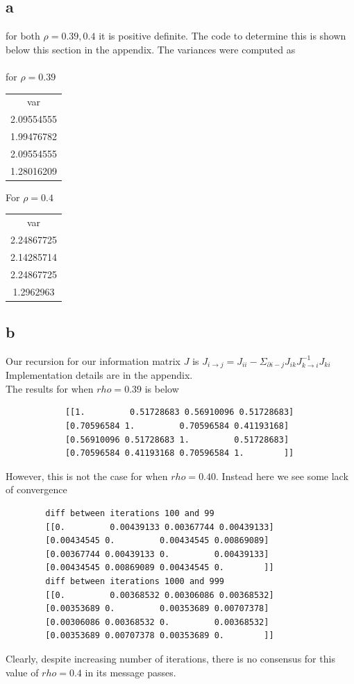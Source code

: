 \documentclass[12pt]{article}
\begin{document}
\begin{section}{6.3}
	\subsection{a}
	for both $\rho=0.39 , 0.4$ it is positive definite. The code to determine this is shown below this section in the appendix. The variances were computed as
	\\
	\\
	for $\rho = 0.39$
\begin{center}
	\begin{tabular}{||c||} 
		\hline
		var\\
		2.09554555 \\
		1.99476782 \\
		2.09554555 \\
		1.28016209 \\
		\hline
	\end{tabular}
\end{center}
For $\rho = 0.4$
\begin{center}
	\begin{tabular}{||c||} 
		\hline
		var\\
		2.24867725\\
		2.14285714\\
		2.24867725\\
		1.2962963\\
		\hline
	\end{tabular}
\end{center}

	\subsection{b}
		Our recursion for our information matrix $J$ is $J_{i\rightarrow j} = J_{ii} -  \Sigma_{\partial i - j} J_{ik}J_{k\rightarrow i}^{-1}J_{ki}$ \\
		Implementation details are in the appendix.\\
		The results for when $rho = 0.39$ is below 
		\begin{verbatim}
			[[1.         0.51728683 0.56910096 0.51728683]
			[0.70596584 1.         0.70596584 0.41193168]
			[0.56910096 0.51728683 1.         0.51728683]
			[0.70596584 0.41193168 0.70596584 1.        ]]
		\end{verbatim}
	However, this is not the case for when $rho = 0.40$. Instead here we see some lack of convergence
	\begin{verbatim}
		diff between iterations 100 and 99
		[[0.         0.00439133 0.00367744 0.00439133]
		[0.00434545 0.         0.00434545 0.00869089]
		[0.00367744 0.00439133 0.         0.00439133]
		[0.00434545 0.00869089 0.00434545 0.        ]]
		diff between iterations 1000 and 999
		[[0.         0.00368532 0.00306086 0.00368532]
		[0.00353689 0.         0.00353689 0.00707378]
		[0.00306086 0.00368532 0.         0.00368532]
		[0.00353689 0.00707378 0.00353689 0.        ]]
	\end{verbatim}
	Clearly, despite increasing number of iterations, there is no consensus for this value of $rho = 0.4$ in its message passes.

\end{section}
\end{document}
